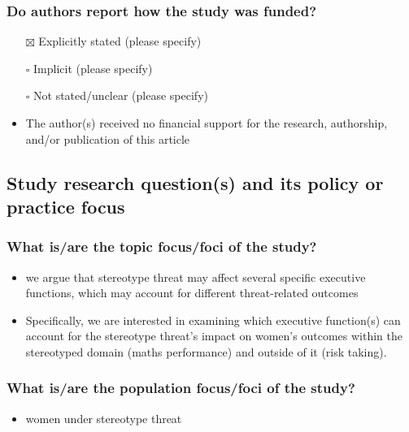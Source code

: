 \documentclass[
  doc, a4paper]{apa7}
\providecommand{\tightlist}{%
  \setlength{\itemsep}{0pt}\setlength{\parskip}{0pt}}
\begin{document}
\subsubsection{Do authors report how the study was funded?}\label{do-authors-report-how-the-study-was-funded}

\begin{itemize}
\item[$\boxtimes$]
  Explicitly stated (please specify)\\
\item[$\square$]
  Implicit (please specify)\\
\item[$\square$]
  Not stated/unclear (please specify)
\item
  The author(s) received no financial support for the research, authorship, and/or publication of this article
\end{itemize}

\subsection{Study research question(s) and its policy or practice focus}\label{study-research-questions-and-its-policy-or-practice-focus}

\subsubsection{What is/are the topic focus/foci of the study?}\label{what-isare-the-topic-focusfoci-of-the-study}

\begin{itemize}
\tightlist
\item
  we argue that stereotype threat may affect several specific executive functions, which may account for different threat-related outcomes
\item
  Specifically, we are interested in examining which executive function(s) can account for the stereotype threat's impact on women's outcomes within the stereotyped domain (maths performance) and outside of it (risk taking).
\end{itemize}

\subsubsection{What is/are the population focus/foci of the study?}\label{what-isare-the-population-focusfoci-of-the-study}

\begin{itemize}
\tightlist
\item
  women under stereotype threat
\end{itemize}
\end{document}
